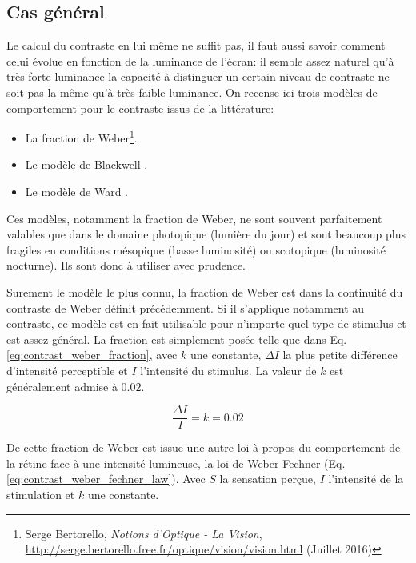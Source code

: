 	\subsection{Cas général}
	\par Le calcul du contraste en lui même ne suffit pas, il faut aussi savoir comment celui évolue en fonction de la luminance de l'écran: il semble assez naturel qu'à très forte luminance la capacité à distinguer un certain niveau de contraste ne soit pas la même qu'à très faible luminance. On recense ici trois modèles de comportement pour le contraste issus de la littérature:
	\begin{itemize}
		\item La fraction de Weber\footnote{Serge Bertorello, \textit{Notions d'Optique - La Vision}, \url{http://serge.bertorello.free.fr/optique/vision/vision.html} (Juillet 2016)}.
		\item Le modèle de Blackwell \citep{international_commission_on_illumination_analytic_1981}.
		\item Le modèle de Ward \citep{heckbert_contrast-based_1994}.
	\end{itemize}
	
	\par Ces modèles, notamment la fraction de Weber, ne sont souvent parfaitement valables que dans le domaine photopique (lumière du jour) et sont beaucoup plus fragiles en conditions mésopique (basse luminosité) ou scotopique (luminosité nocturne). Ils sont donc à utiliser avec prudence.

	\par Surement le modèle le plus connu, la fraction de Weber est dans la continuité du contraste de Weber définit précédemment. Si il s'applique notamment au contraste, ce modèle est en fait utilisable pour n'importe quel type de stimulus et est assez général. La fraction est simplement posée telle que dans Eq. \ref{eq:contrast_weber_fraction}, avec $k$ une constante, $\Delta I$ la plus petite différence d'intensité perceptible et $I$ l'intensité du stimulus. La valeur de $k$ est généralement admise à $0.02$.
	
	\begin{equation}
	\frac{\Delta I}{I} = k = 0.02
	\label{eq:contrast_weber_fraction}
	\end{equation}
	
	\par De cette fraction de Weber est issue une autre loi à propos du comportement de la rétine face à une intensité lumineuse, la loi de Weber-Fechner (Eq. \ref{eq:contrast_weber_fechner_law}). Avec $S$ la sensation perçue, $I$ l'intensité de la stimulation et $k$ une constante.
	
